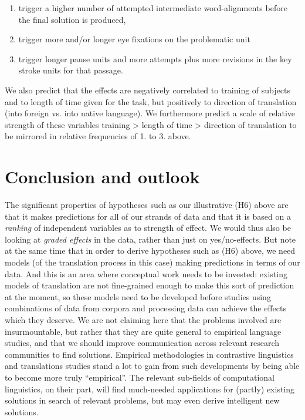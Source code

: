 \documentclass[output=paper]{LSP/langsci}
\begin{document}
\begin{exe}
\begin{exe}
\begin{exe}
\begin{exe}
\begin{exe}
\begin{exe}
\begin{enumerate}
\item
trigger a higher number of attempted intermediate word-alignments before the final solution is produced,
\item 
trigger more and/or longer eye fixations on the problematic unit
\item 
trigger longer pause units and more attempts plus more revisions in the key stroke units for that passage.
\end{enumerate}

We also predict that the effects are negatively correlated to training of subjects and to length of time given for the task, but positively to direction of translation (into foreign vs. into native language). We furthermore predict a scale of relative strength of these variables training {\textgreater} length of time {\textgreater} direction of translation to be mirrored in relative frequencies of 1. to 3. above. 


\section{Conclusion and outlook}\label{sec:steiner:5} 

The significant properties of hypotheses such as our illustrative {(H6)} above are that it makes predictions for all of our strands of data and that it is based on a \textit{ranking} of independent variables as to strength of effect. We would thus also be looking at \textit{graded effects} in the data, rather than just on yes/no-effects. But note at the same time that in order to derive hypotheses such as {(H6)} above, we need models (of the translation process in this case) making predictions in terms of our data. And this is an area where conceptual work needs to be invested: existing models of translation are not fine-grained enough to make this sort of prediction at the moment, so these models need to be developed before studies using combinations of data from corpora and processing data can achieve the effects which they deserve. We are not claiming here that the problems involved are insurmountable, but rather that they are quite general to empirical language studies, and that we should improve communication across relevant research communities to find solutions. Empirical methodologies in contrastive linguistics and translations studies stand a lot to gain from such developments by being able to become more truly ``empirical''. The relevant sub-fields of computational linguistics, on their part, will find much-needed applications for (partly) existing solutions in search of relevant problems, but may even derive intelligent new solutions. 


\end{exe}
\end{exe}
\end{exe}
\end{exe}
\end{exe}
\end{exe}
\end{document}
